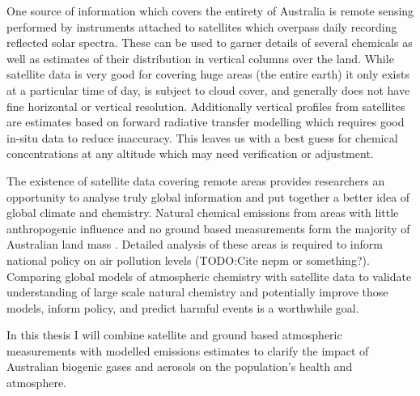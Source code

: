 One source of information which covers the entirety of Australia is remote sensing performed by instruments attached to satellites which overpass daily recording reflected solar spectra.
These can be used to garner details of several chemicals as well as estimates of their distribution in vertical columns over the land.
While satellite data is very good for covering huge areas (the entire earth) it only exists at a particular time of day, is subject to cloud cover, and generally does not have fine horizontal or vertical resolution.
Additionally vertical profiles from satellites are estimates based on forward radiative transfer modelling which requires good in-situ data to reduce inaccuracy.
This leaves us with a best guess for chemical concentrations at any altitude which may need verification or adjustment.

The existence of satellite data covering remote areas provides researchers an opportunity to analyse truly global information and put together a better idea of global climate and chemistry.
Natural chemical emissions from areas with little anthropogenic influence and no ground based measurements form the majority of Australian land mass \cite{VanDerA_2008}.
Detailed analysis of these areas is required to inform national policy on air pollution levels (TODO:Cite nepm or something?).   
Comparing global models of atmospheric chemistry with satellite data to validate understanding of large scale natural chemistry and potentially improve those models, inform policy, and predict harmful events is a worthwhile goal.

In this thesis I will combine satellite and ground based atmospheric measurements with modelled emissions estimates to clarify the impact of Australian biogenic gases and aerosols on the population's health and atmosphere.
